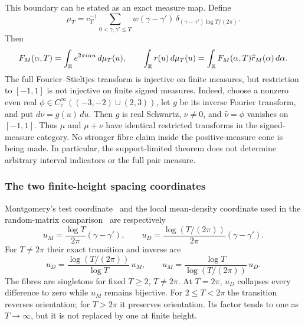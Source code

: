 This boundary can be stated as an exact measure map.  Define
\begin{equation}
 \mu_T=c_T^{-1}\sum_{0<\gamma,\gamma'\leq T}
 w(\gamma-\gamma')\,
 \delta_{(\gamma-\gamma')\log T/(2\pi)}.
 \label{eq:weighted-pair-measure}
\end{equation}
Then
\begin{equation}
 F_M(\alpha,T)=\int_\mathbb R e^{2\pi i\alpha u}\,d\mu_T(u),
 \qquad
 \int_\mathbb R r(u)\,d\mu_T(u)
 =\int_\mathbb R F_M(\alpha,T)\widehat r_M(\alpha)\,d\alpha.
 \label{eq:pair-measure-transform}
\end{equation}
The full Fourier--Stieltjes transform is injective on finite measures, but restriction to
$[-1,1]$ is not injective on finite signed measures.  Indeed, choose a nonzero even real
$\phi\in C_c^\infty((-3,-2)\cup(2,3))$, let $g$ be its inverse Fourier transform, and put
$d\nu=g(u)\,du$.  Then $g$ is real Schwartz, $\nu\neq0$, and
$\widehat\nu=\phi$ vanishes on $[-1,1]$.  Thus $\mu$ and $\mu+\nu$ have identical
restricted transforms in the signed-measure category.  No stronger fibre claim inside the
positive-measure cone is being made.  In particular, the support-limited theorem does not
determine arbitrary interval indicators or the full pair measure.

\subsubsection{The two finite-height spacing coordinates}

Montgomery's test coordinate~\cite{montgomery1973} and the local mean-density coordinate
used in the random-matrix comparison~\cite{keatingSnaith2000} are respectively
\begin{equation}
 u_M=\frac{\log T}{2\pi}(\gamma-\gamma'),
 \qquad
 u_D=\frac{\log(T/(2\pi))}{2\pi}(\gamma-\gamma').
 \label{eq:two-unfoldings}
\end{equation}
For $T\neq2\pi$ their exact transition and inverse are
\begin{equation}
 u_D=\frac{\log(T/(2\pi))}{\log T}\,u_M,
 \qquad
 u_M=\frac{\log T}{\log(T/(2\pi))}\,u_D.
 \label{eq:unfolding-transition}
\end{equation}
The fibres are singletons for fixed $T\geq2$, $T\neq2\pi$.  At $T=2\pi$, $u_D$
collapses every difference to zero while $u_M$ remains bijective.  For
$2\leq T<2\pi$ the transition reverses orientation; for $T>2\pi$ it preserves
orientation.  Its factor tends to one as $T\to\infty$, but it is not replaced by one at
finite height.

